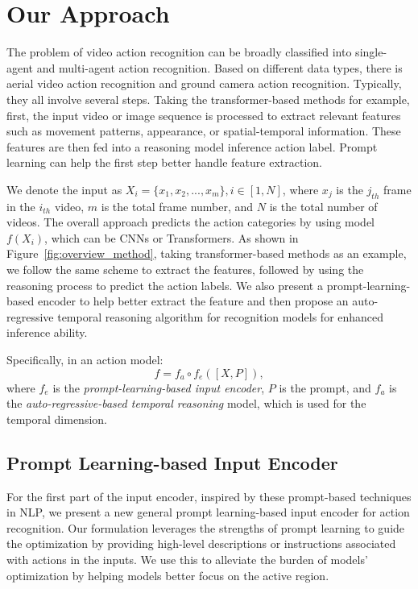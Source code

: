 \documentclass[letterpaper, 10 pt, conference]{ieeeconf}
\begin{document}
 

\section{Our Approach}
The problem of video action recognition can be broadly classified into single-agent and multi-agent action recognition. Based on different data types, there is aerial video action recognition and ground camera action recognition. Typically, they all involve several steps. Taking the transformer-based methods for example,  first, the input video or image sequence is processed to extract relevant features such as movement patterns, appearance, or spatial-temporal information. These features are then fed into a reasoning model inference action label.  Prompt learning can help the first step better handle feature extraction.



We denote the input as $X_i=\{x_1, x_2, ..., x_m\}, i\in [1, N]$, where $x_j$ is the $j_{th}$ frame in the $i_{th}$ video, $m$ is the total frame number, and $N$ is the total number of videos. The overall approach predicts the action categories by using model $f(X_i)$, which can be CNNs or Transformers. As shown in Figure~\ref{fig:overview_method}, taking transformer-based methods as an example, we follow the same scheme to extract the features, followed by using the reasoning process to predict the action labels. We also present a prompt-learning-based encoder to help better extract the feature and then propose an auto-regressive temporal reasoning algorithm for recognition models for enhanced inference ability.

Specifically, in an action model:
 \begin{equation}
 f=f_a\circ f_e([X,P]), 
\end{equation}
 where $f_e$ is the \emph{prompt-learning-based input encoder}, $P$ is the prompt, and $f_a$ is the \emph{auto-regressive-based temporal reasoning} model, which is used for the temporal dimension. 
 


\subsection{Prompt Learning-based Input Encoder}
For the first part of the input encoder, inspired by these prompt-based techniques in NLP, we present a new general prompt learning-based input encoder for action recognition. Our formulation leverages the strengths of prompt learning to guide the optimization by providing high-level descriptions or instructions associated with actions in the inputs. We use this to alleviate the burden of models' optimization by helping models better focus on the active region. 
 
\end{document}
